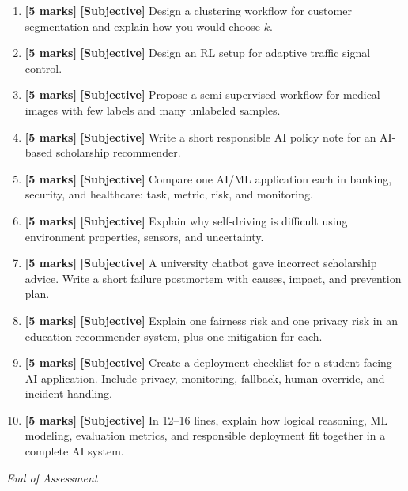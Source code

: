\documentclass[11pt,a4paper]{article}
\newcommand{\HMarks}{\textbf{[5 marks]} }
\begin{document}
\begin{enumerate}[label=\textbf{H\arabic*.}, leftmargin=*]
  \item \HMarks \textbf{[Subjective]} Design a clustering workflow for customer segmentation and explain how you would choose $k$.

  \item \HMarks \textbf{[Subjective]} Design an RL setup for adaptive traffic signal control.

  \item \HMarks \textbf{[Subjective]} Propose a semi-supervised workflow for medical images with few labels and many unlabeled samples.

  \item \HMarks \textbf{[Subjective]} Write a short responsible AI policy note for an AI-based scholarship recommender.

  \item \HMarks \textbf{[Subjective]} Compare one AI/ML application each in banking, security, and healthcare:
    task, metric, risk, and monitoring.

  \item \HMarks \textbf{[Subjective]} Explain why self-driving is difficult using environment properties,
    sensors, and uncertainty.

  \item \HMarks \textbf{[Subjective]} A university chatbot gave incorrect scholarship advice.
    Write a short failure postmortem with causes, impact, and prevention plan.

  \item \HMarks \textbf{[Subjective]} Explain one fairness risk and one privacy risk in an education recommender system,
    plus one mitigation for each.

  \item \HMarks \textbf{[Subjective]} Create a deployment checklist for a student-facing AI application.
    Include privacy, monitoring, fallback, human override, and incident handling.

  \item \HMarks \textbf{[Subjective]} In 12--16 lines, explain how logical reasoning, ML modeling, evaluation metrics,
    and responsible deployment fit together in a complete AI system.
\end{enumerate}

\vfill
\noindent\textit{End of Assessment}
\end{document}
